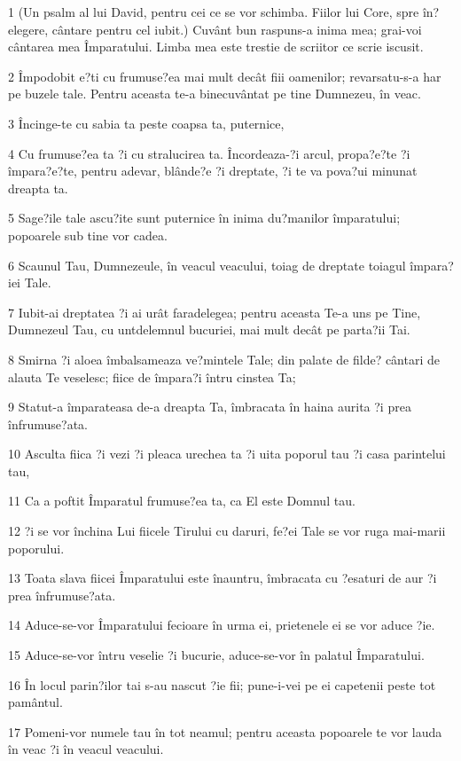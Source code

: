 \par 1 (Un psalm al lui David, pentru cei ce se vor schimba. Fiilor lui Core, spre în?elegere, cântare pentru cel iubit.) Cuvânt bun raspuns-a inima mea; grai-voi cântarea mea Împaratului. Limba mea este trestie de scriitor ce scrie iscusit.
\par 2 Împodobit e?ti cu frumuse?ea mai mult decât fiii oamenilor; revarsatu-s-a har pe buzele tale. Pentru aceasta te-a binecuvântat pe tine Dumnezeu, în veac.
\par 3 Încinge-te cu sabia ta peste coapsa ta, puternice,
\par 4 Cu frumuse?ea ta ?i cu stralucirea ta. Încordeaza-?i arcul, propa?e?te ?i împara?e?te, pentru adevar, blânde?e ?i dreptate, ?i te va pova?ui minunat dreapta ta.
\par 5 Sage?ile tale ascu?ite sunt puternice în inima du?manilor împaratului; popoarele sub tine vor cadea.
\par 6 Scaunul Tau, Dumnezeule, în veacul veacului, toiag de dreptate toiagul împara?iei Tale.
\par 7 Iubit-ai dreptatea ?i ai urât faradelegea; pentru aceasta Te-a uns pe Tine, Dumnezeul Tau, cu untdelemnul bucuriei, mai mult decât pe parta?ii Tai.
\par 8 Smirna ?i aloea îmbalsameaza ve?mintele Tale; din palate de filde? cântari de alauta Te veselesc; fiice de împara?i întru cinstea Ta;
\par 9 Statut-a împarateasa de-a dreapta Ta, îmbracata în haina aurita ?i prea înfrumuse?ata.
\par 10 Asculta fiica ?i vezi ?i pleaca urechea ta ?i uita poporul tau ?i casa parintelui tau,
\par 11 Ca a poftit Împaratul frumuse?ea ta, ca El este Domnul tau.
\par 12 ?i se vor închina Lui fiicele Tirului cu daruri, fe?ei Tale se vor ruga mai-marii poporului.
\par 13 Toata slava fiicei Împaratului este înauntru, îmbracata cu ?esaturi de aur ?i prea înfrumuse?ata.
\par 14 Aduce-se-vor Împaratului fecioare în urma ei, prietenele ei se vor aduce ?ie.
\par 15 Aduce-se-vor întru veselie ?i bucurie, aduce-se-vor în palatul Împaratului.
\par 16 În locul parin?ilor tai s-au nascut ?ie fii; pune-i-vei pe ei capetenii peste tot pamântul.
\par 17 Pomeni-vor numele tau în tot neamul; pentru aceasta popoarele te vor lauda în veac ?i în veacul veacului.


